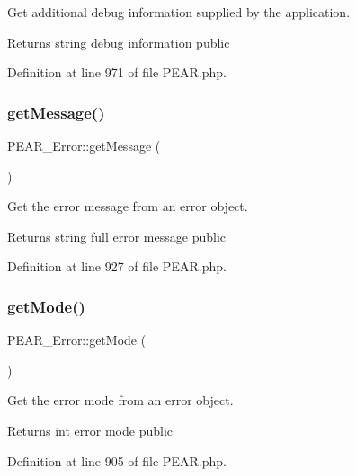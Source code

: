 Get additional debug information supplied by the application.

\begin{DoxyReturn}{Returns}
string debug information  public 
\end{DoxyReturn}


Definition at line 971 of file P\+E\+A\+R.\+php.

\hypertarget{classPEAR__Error_a00beb48b680580de68477d0f77e27510}{}\label{classPEAR__Error_a00beb48b680580de68477d0f77e27510} 
\subsubsection{\texorpdfstring{get\+Message()}{getMessage()}}
{\footnotesize\ttfamily P\+E\+A\+R\+\_\+\+Error\+::get\+Message (\begin{DoxyParamCaption}{ }\end{DoxyParamCaption})}

Get the error message from an error object.

\begin{DoxyReturn}{Returns}
string full error message  public 
\end{DoxyReturn}


Definition at line 927 of file P\+E\+A\+R.\+php.

\hypertarget{classPEAR__Error_adf8ebb12d192a152c0f3f80b5ca01e7c}{}\label{classPEAR__Error_adf8ebb12d192a152c0f3f80b5ca01e7c} 
\subsubsection{\texorpdfstring{get\+Mode()}{getMode()}}
{\footnotesize\ttfamily P\+E\+A\+R\+\_\+\+Error\+::get\+Mode (\begin{DoxyParamCaption}{ }\end{DoxyParamCaption})}

Get the error mode from an error object.

\begin{DoxyReturn}{Returns}
int error mode  public 
\end{DoxyReturn}


Definition at line 905 of file P\+E\+A\+R.\+php.

